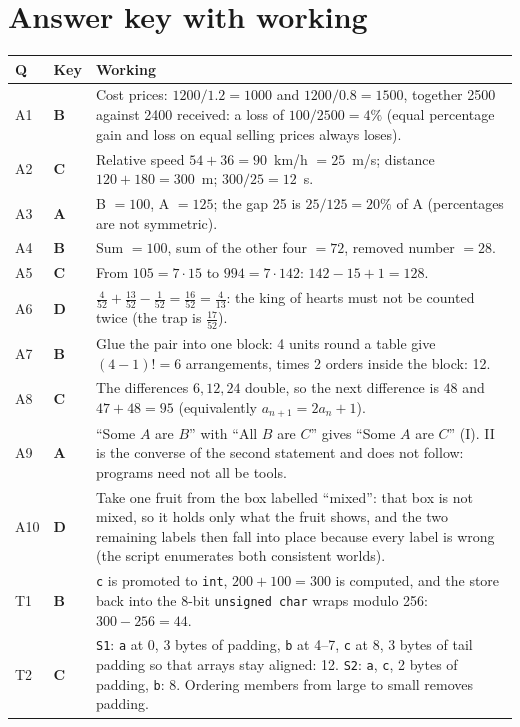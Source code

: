\documentclass[10pt,a4paper,openany,oneside]{report}
\newcommand{\prio}[1]{\texorpdfstring{\ifcase#1\or{\color{gold}\ding{72}}\or{\color{gold}\ding{72}\ding{72}}\or{\color{gold}\ding{72}\ding{72}\ding{72}}\fi}{}}
\begin{document}
\section{Answer key with working \prio{3}}
\begin{center}\small
\begin{xltabular}{\textwidth}{@{}L{0.9cm}L{0.7cm}Y@{}}
\toprule
\textbf{Q} & \textbf{Key} & \textbf{Working}\\
\midrule\endhead
A1 & \textbf{B} & Cost prices: $1200/1.2=1000$ and $1200/0.8=1500$, together 2500 against 2400 received: a loss of $100/2500=4\%$ (equal percentage gain and loss on equal selling prices always loses).\\
A2 & \textbf{C} & Relative speed $54+36=90$~km/h $=25$~m/s; distance $120+180=300$~m; $300/25=12$~s.\\
A3 & \textbf{A} & B $=100$, A $=125$; the gap 25 is $25/125=20\%$ of A (percentages are not symmetric).\\
A4 & \textbf{B} & Sum $=100$, sum of the other four $=72$, removed number $=28$.\\
A5 & \textbf{C} & From $105=7\cdot15$ to $994=7\cdot142$: $142-15+1=128$.\\
A6 & \textbf{D} & $\frac4{52}+\frac{13}{52}-\frac1{52}=\frac{16}{52}=\frac4{13}$: the king of hearts must not be counted twice (the trap is $\frac{17}{52}$).\\
A7 & \textbf{B} & Glue the pair into one block: 4 units round a table give $(4-1)!=6$ arrangements, times 2 orders inside the block: 12.\\
A8 & \textbf{C} & The differences $6,12,24$ double, so the next difference is $48$ and $47+48=95$ (equivalently $a_{n+1}=2a_n+1$).\\
A9 & \textbf{A} & ``Some $A$ are $B$'' with ``All $B$ are $C$'' gives ``Some $A$ are $C$'' (I). II is the converse of the second statement and does not follow: programs need not all be tools.\\
A10 & \textbf{D} & Take one fruit from the box labelled ``mixed'': that box is not mixed, so it holds only what the fruit shows, and the two remaining labels then fall into place because every label is wrong (the script enumerates both consistent worlds).\\
T1 & \textbf{B} & \texttt{c} is promoted to \texttt{int}, $200+100=300$ is computed, and the store back into the 8-bit \texttt{unsigned char} wraps modulo 256: $300-256=44$.\\
T2 & \textbf{C} & \texttt{S1}: \texttt{a} at 0, 3 bytes of padding, \texttt{b} at 4--7, \texttt{c} at 8, 3 bytes of tail padding so that arrays stay aligned: 12. \texttt{S2}: \texttt{a}, \texttt{c}, 2 bytes of padding, \texttt{b}: 8. Ordering members from large to small removes padding.\\

\end{xltabular}
\end{center}
\end{document}
